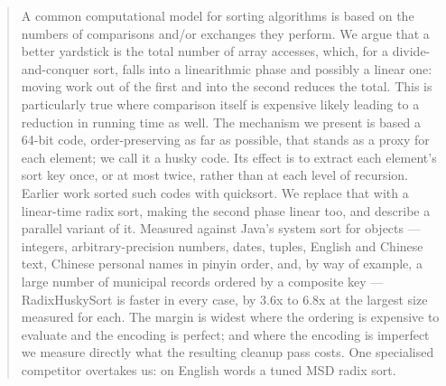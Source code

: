 \documentclass[twoside,leqno,twocolumn]{article}
\newif\ifdraftstamp
\newcommand{\revisionstamp}{%
  \hsstamphr=\time \divide\hsstamphr by 60
  \hsstamptmp=\hsstamphr \multiply\hsstamptmp by 60
  \hsstampmin=\time \advance\hsstampmin by -\hsstamptmp
  \the\year-\ifnum\month<10 0\fi\the\month-\ifnum\day<10 0\fi\the\day\space
  \ifnum\hsstamphr<10 0\fi\the\hsstamphr:\ifnum\hsstampmin<10 0\fi\the\hsstampmin}
\begin{document}
\begin{abstract}
    A common computational model for sorting algorithms is based on the numbers of comparisons and/or exchanges they perform.
    We argue that a better yardstick is the total number of array accesses,
    which, for a divide-and-conquer sort, falls into a linearithmic phase and possibly a linear one:
    moving work out of the first and into the second reduces the total.
    This is particularly true where comparison itself is expensive likely leading to a reduction in running time as well.
    The mechanism we present is based a 64-bit code, order-preserving as far as possible,
    that stands as a proxy for each element; we call it a husky code.
    Its effect is to extract each element's sort key once, or at most twice, rather than at each level of recursion.
    Earlier work sorted such codes with quicksort.
    We replace that with a linear-time radix sort, making the second phase linear too,
    and describe a parallel variant of it.
    Measured against Java's system sort for objects --- integers, arbitrary-precision numbers,
    dates, tuples, English and Chinese text, Chinese personal names in pinyin order,
    and, by way of example, a large number of municipal records ordered by a composite key ---
    RadixHuskySort is faster in every case, by 3.6x to 6.8x at the largest size measured for each.
    The margin is widest where the ordering is expensive to evaluate and the encoding is perfect;
    and where the encoding is imperfect we measure directly what the resulting cleanup pass costs.
    One specialised competitor overtakes us: on English words a tuned MSD radix sort.
\end{abstract}



\fancyfoot[C]{\thepage}
\ifdraftstamp
  \fancyfoot[R]{\footnotesize\itshape draft \revisionstamp}
\fi
\end{document}
